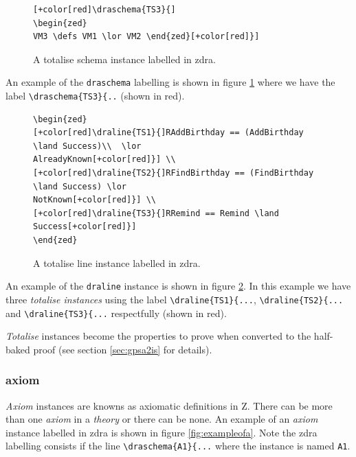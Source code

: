 \begin{figure}[H]
\centering
\begin{footnotesize}
\begin{BVerbatim}[commandchars=+\[\]]
[+color[red]\draschema{TS3}{]
\begin{zed}
VM3 \defs VM1 \lor VM2 \end{zed}[+color[red]}]
\end{BVerbatim}
\end{footnotesize}
\caption{\label{fig:exampleofts1} A totalise schema instance labelled in \gls{zdra}.}
\end{figure}

An example of the \verb|draschema| labelling is shown in figure
\ref{fig:exampleofts1} where we have the label \verb|\draschema{TS3}{..| (shown
in red).

\begin{figure}[H]
\centering
\begin{footnotesize}
\begin{BVerbatim}[commandchars=+\[\]]
\begin{zed} 
[+color[red]\draline{TS1}{]RAddBirthday == (AddBirthday \land Success)\\  \lor
AlreadyKnown[+color[red]}] \\
[+color[red]\draline{TS2}{]RFindBirthday == (FindBirthday \land Success) \lor
NotKnown[+color[red]}] \\
[+color[red]\draline{TS3}{]RRemind == Remind \land Success[+color[red]}]
\end{zed}
\end{BVerbatim}
\end{footnotesize}
\caption{\label{fig:exampleofts2} A totalise line instance labelled in \gls{zdra}.}
\end{figure}

An example of the \verb|draline| instance is shown in figure
\ref{fig:exampleofts2}. In this example we have three \emph{totalise instances}
using the label \verb|\draline{TS1}{...|, \verb|\draline{TS2}{...| and
\verb|\draline{TS3}{...| respectfully (shown in red).

\emph{Totalise} instances become the properties to prove when converted to the
half-baked proof (see section \ref{sec:gpsa2is} for details).


\subsubsection{axiom}

\emph{Axiom} instances are knowns as axiomatic definitions in Z. There can be
more than one \emph{axiom} in a \emph{theory} or there can be none. An example
of an \emph{axiom} instance labelled in \gls{zdra} is shown in figure
\ref{fig:exampleofa}. Note the \gls{zdra} labelling consists if the line
\verb|\draschema{A1}{...| where the instance is named \verb|A1|.

